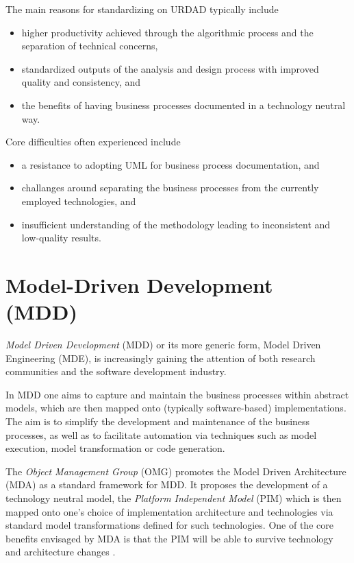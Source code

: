 \documentclass[reviewcopy]{elsart}
\begin{document}
The main reasons for standardizing on URDAD typically include
\begin{itemize}
  \item higher productivity achieved through the algorithmic process and the separation of technical concerns,
  \item standardized outputs of the analysis and design process with improved quality and consistency, and
  \item the benefits of having business processes documented in a technology neutral way.
\end{itemize}

Core difficulties often experienced include
\begin{itemize}
  \item a resistance to adopting UML for business process documentation, and
  \item challanges around separating the business processes from the currently employed technologies, and
  \item insufficient understanding of the methodology leading to inconsistent and low-quality results.
\end{itemize}


\section{Model-Driven Development (MDD)}


{\em Model Driven Development} (MDD) or its more generic form, Model Driven
Engineering (MDE),
\cite{selic:pragmaticsOfModelDrivenDevelopment,schmidt:modelDrivenEngineering, france:mddUsingUml2}
is increasingly gaining the attention of both research communities and the software development industry.

In MDD one aims to capture and maintain the business processes within abstract models,
which are then mapped onto (typically software-based) implementations. The
aim is to simplify the development and maintenance of the business processes,
as well as to facilitate automation via techniques such as model execution, model transformation 
or code generation.

The {\em Object Management Group} (OMG) promotes the Model Driven Architecture
(MDA) \cite{pastor:mdaInPractice,siegel:developingInMDA,frankel:enterpriseMDA,
stahl:mdsd}
as a standard framework for MDD. It proposes the development of a
technology neutral model, the {\em Platform Independent Model} (PIM) which is
then mapped onto one's choice of implementation architecture and technologies
via standard model transformations defined for such technologies. One of the
core benefits envisaged by MDA is that the PIM will be able to survive
technology and architecture changes \cite{siegel:developingInMDA}.
\end{document}
